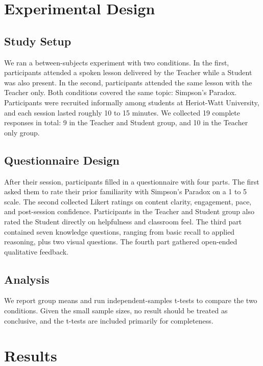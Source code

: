 \section{Experimental Design}
\label{sec:evaluation}

\subsection{Study Setup}

We ran a between-subjects experiment with two conditions. In the first, participants attended a spoken lesson delivered by the Teacher while a Student was also present. In the second, participants attended the same lesson with the Teacher only. Both conditions covered the same topic: Simpson's Paradox. Participants were recruited informally among students at Heriot-Watt University, and each session lasted roughly 10 to 15 minutes. We collected 19 complete responses in total: 9 in the Teacher and Student group, and 10 in the Teacher only group.

\subsection{Questionnaire Design}

After their session, participants filled in a questionnaire with four parts. The first asked them to rate their prior familiarity with Simpson's Paradox on a 1 to 5 scale. The second collected Likert ratings on content clarity, engagement, pace, and post-session confidence. Participants in the Teacher and Student group also rated the Student directly on helpfulness and classroom feel. The third part contained seven knowledge questions, ranging from basic recall to applied reasoning, plus two visual questions. The fourth part gathered open-ended qualitative feedback.

\subsection{Analysis}

We report group means and run independent-samples t-tests to compare the two conditions. Given the small sample sizes, no result should be treated as conclusive, and the t-tests are included primarily for completeness.


\section{Results}
\label{sec:results}

